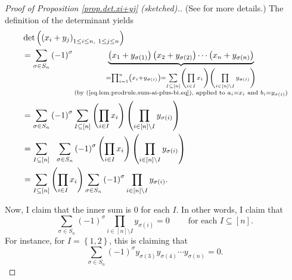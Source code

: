 \begin{proof}
[Proof of Proposition \ref{prop.det.xi+yj} (sketched).](See \cite[Example
6.7]{detnotes} for more details.) The definition of the determinant yields%
\begin{align*}
&  \det\left(  \left(  x_{i}+y_{j}\right)  _{1\leq i\leq n,\ 1\leq j\leq
n}\right) \\
&  =\sum_{\sigma\in S_{n}}\left(  -1\right)  ^{\sigma}\underbrace{\left(
x_{1}+y_{\sigma\left(  1\right)  }\right)  \left(  x_{2}+y_{\sigma\left(
2\right)  }\right)  \cdots\left(  x_{n}+y_{\sigma\left(  n\right)  }\right)
}_{\substack{=\prod_{i=1}^{n}\left(  x_{i}+y_{\sigma\left(  i\right)
}\right)  =\sum\limits_{I\subseteq\left[  n\right]  }\left(  \prod
\limits_{i\in I}x_{i}\right)  \left(  \prod\limits_{i\in\left[  n\right]
\setminus I}y_{\sigma\left(  i\right)  }\right)  \\\text{(by
(\ref{eq.lem.prodrule.sum-ai-plus-bi.eq}), applied to }a_{i}=x_{i}\text{ and
}b_{i}=y_{\sigma\left(  i\right)  }\text{)}}}\\
&  =\sum_{\sigma\in S_{n}}\left(  -1\right)  ^{\sigma}\sum\limits_{I\subseteq
\left[  n\right]  }\left(  \prod\limits_{i\in I}x_{i}\right)  \left(
\prod\limits_{i\in\left[  n\right]  \setminus I}y_{\sigma\left(  i\right)
}\right) \\
&  =\sum\limits_{I\subseteq\left[  n\right]  }\ \ \sum_{\sigma\in S_{n}%
}\left(  -1\right)  ^{\sigma}\left(  \prod\limits_{i\in I}x_{i}\right)
\left(  \prod\limits_{i\in\left[  n\right]  \setminus I}y_{\sigma\left(
i\right)  }\right) \\
&  =\sum\limits_{I\subseteq\left[  n\right]  }\left(  \prod\limits_{i\in
I}x_{i}\right)  \sum_{\sigma\in S_{n}}\left(  -1\right)  ^{\sigma}%
\prod\limits_{i\in\left[  n\right]  \setminus I}y_{\sigma\left(  i\right)  }.
\end{align*}


Now, I claim that the inner sum is $0$ for each $I$. In other words, I claim
that%
\begin{equation}
\sum_{\sigma\in S_{n}}\left(  -1\right)  ^{\sigma}\prod\limits_{i\in\left[
n\right]  \setminus I}y_{\sigma\left(  i\right)  }%
=0\ \ \ \ \ \ \ \ \ \ \text{for each }I\subseteq\left[  n\right]  .
\label{pf.prop.det.xi+yj.innersum}%
\end{equation}
For instance, for $I=\left\{  1,2\right\}  $, this is claiming that%
\[
\sum_{\sigma\in S_{n}}\left(  -1\right)  ^{\sigma}y_{\sigma\left(  3\right)
}y_{\sigma\left(  4\right)  }\cdots y_{\sigma\left(  n\right)  }=0.
\]



\end{proof}
